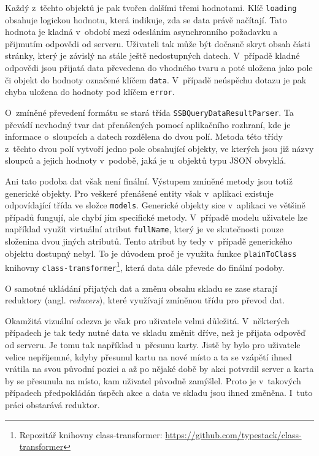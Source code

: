 Každý z~těchto objektů je pak tvořen dalšími třemi hodnotami. Klíč \texttt{loading} obsahuje logickou hodnotu, která indikuje, zda se data právě načítají. Tato hodnota je kladná v~období mezi odesláním asynchronního požadavku a přijmutím odpovědi od serveru. Uživateli tak může být dočasně skryt obsah části stránky, který je závislý na stále ještě nedostupných datech. V~případě kladné odpovědi jsou přijatá data převedena do vhodného tvaru a poté uložena jako pole či objekt do hodnoty označené klíčem \texttt{data}. V~případě neúspěchu dotazu je pak chyba uložena do hodnoty pod klíčem \texttt{error}.

O~zmíněné převedení formátu se stará třída \texttt{SSBQueryDataResultParser}. Ta převádí nevhodný tvar dat přenášených pomocí aplikačního rozhraní, kde je informace o~sloupcích a datech rozdělena do dvou polí. Metoda této třídy z~těchto dvou polí vytvoří jedno pole obsahující objekty, ve kterých jsou již názvy sloupců a jejich hodnoty v~podobě, jaká je u~objektů typu JSON obvyklá.

Ani tato podoba dat však není finální. Výstupem zmíněné metody jsou totiž generické objekty. Pro veškeré přenášené entity však v~aplikaci existuje odpovídající třída ve složce \texttt{models}. Generické objekty sice v~aplikaci ve většině případů fungují, ale chybí jím specifické metody. V~případě modelu uživatele lze například využít virtuální atribut \texttt{fullName}, který je ve skutečnosti pouze složenina dvou jiných atributů. Tento atribut by tedy v~případě generického objektu dostupný nebyl. 
To je důvodem proč je využita funkce \texttt{plainToClass} knihovny \texttt{class-transformer}\footnote{Repozitář knihovny class-transformer: \url{https://github.com/typestack/class-transformer}}, která data dále převede do finální podoby.

O samotné ukládání přijatých dat a změnu obsahu skladu se zase starají reduktory (angl. \emph{reducers}), které využívají zmíněnou třídu pro převod dat. 

Okamžitá vizuální odezva je však pro uživatele velmi důležitá. V~některých případech je tak tedy nutné data ve skladu změnit dříve, než je přijata odpověď od serveru. Je tomu tak například u~přesunu karty. Jistě by bylo pro uživatele velice nepříjemné, kdyby přesunul kartu na nové místo a ta se vzápětí ihned vrátila na svou původní pozici a až po nějaké době by akci potvrdil server a karta by se přesunula na místo, kam uživatel původně zamýšlel. Proto je v~takových případech předpokládán úspěch akce a data ve skladu jsou ihned změněna. I~tuto práci obstarává reduktor.

